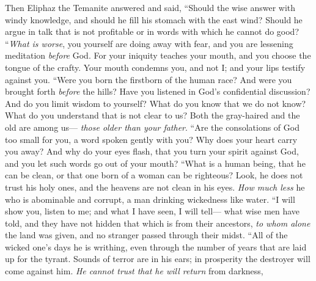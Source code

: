 \begin{biblechapter} %
 Then Eliphaz the Temanite answered and said,
\verse “Should the wise answer with windy knowledge, 
and should he fill his stomach with the east wind?
\verse Should he argue in talk that is not profitable 
or in words with which he cannot do good?
\verse “\textit{What is worse}, you yourself are doing away with fear, 
and you are lessening meditation \textit{before} God.
\verse For your iniquity teaches your mouth, 
and you choose the tongue of the crafty.
\verse Your mouth condemns you, and not I; 
and your lips testify against you.
\verse “Were you born the firstborn of the human race? 
And were you brought forth \textit{before} the hills?
\verse Have you listened in God’s confidential discussion? 
And do you limit wisdom to yourself?
\verse What do you know that we do not know? 
What do you understand that is not clear to us?
\verse Both the gray-haired and the old are among us— 
\textit{those older than your father}.
\verse “Are the consolations of God too small for you, 
a word spoken gently with you?
\verse Why does your heart carry you away? 
And why do your eyes flash,
\verse that you turn your spirit against God, 
and you let such words go out of your mouth?
\verse “What is a human being, that he can be clean, 
or that one born of a woman can be righteous?
\verse Look, he does not trust his holy ones, 
and the heavens are not clean in his eyes.
\verse \textit{How much less} he who is abominable and corrupt, 
a man drinking wickedness like water.
\verse “I will show you, listen to me; 
and what I have seen, I will tell—
\verse what wise men have told, 
and they have not hidden that which is from their ancestors,
\verse \textit{to whom alone} the land was given, 
and no stranger passed through their midst.
\verse “All of the wicked one’s days he is writhing, 
even through the number of years that are laid up for the tyrant.
\verse Sounds of terror are in his ears; 
in prosperity the destroyer will come against him.
\verse \textit{He cannot trust that he will return} from darkness, 

\end{biblechapter}
